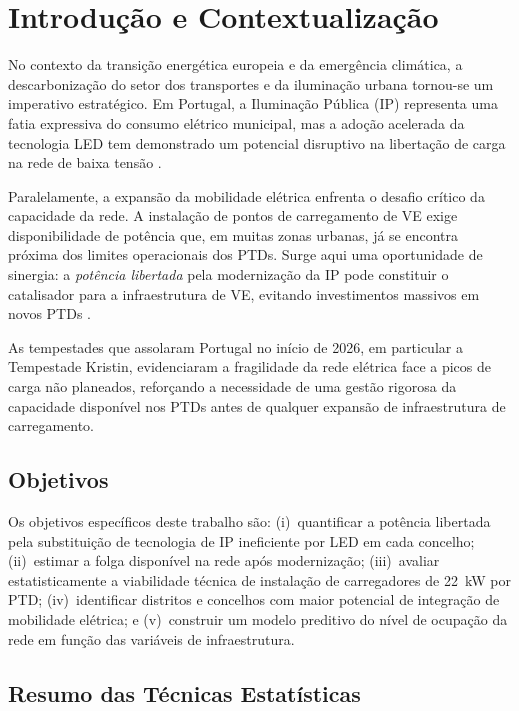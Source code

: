 \documentclass[conference]{IEEEtran}
\begin{document}
\section{Introdução e Contextualização}

No contexto da transição energética europeia e da emergência climática, a descarbonização do setor dos transportes e da iluminação urbana tornou-se um imperativo estratégico. Em Portugal, a Iluminação Pública (IP) representa uma fatia expressiva do consumo elétrico municipal, mas a adoção acelerada da tecnologia LED tem demonstrado um potencial disruptivo na libertação de carga na rede de baixa tensão \cite{b1}.

Paralelamente, a expansão da mobilidade elétrica enfrenta o desafio crítico da capacidade da rede. A instalação de pontos de carregamento de VE exige disponibilidade de potência que, em muitas zonas urbanas, já se encontra próxima dos limites operacionais dos PTDs. Surge aqui uma oportunidade de sinergia: a \textit{potência libertada} pela modernização da IP pode constituir o catalisador para a infraestrutura de VE, evitando investimentos massivos em novos PTDs \cite{b5}.

As tempestades que assolaram Portugal no início de 2026, em particular a Tempestade Kristin, evidenciaram a fragilidade da rede elétrica face a picos de carga não planeados, reforçando a necessidade de uma gestão rigorosa da capacidade disponível nos PTDs antes de qualquer expansão de infraestrutura de carregamento.

\subsection{Objetivos}

Os objetivos específicos deste trabalho são: (i)~quantificar a potência libertada pela substituição de tecnologia de IP ineficiente por LED em cada concelho; (ii)~estimar a folga disponível na rede após modernização; (iii)~avaliar estatisticamente a viabilidade técnica de instalação de carregadores de 22~kW por PTD; (iv)~identificar distritos e concelhos com maior potencial de integração de mobilidade elétrica; e (v)~construir um modelo preditivo do nível de ocupação da rede em função das variáveis de infraestrutura.

\subsection{Resumo das Técnicas Estatísticas}
\end{document}
